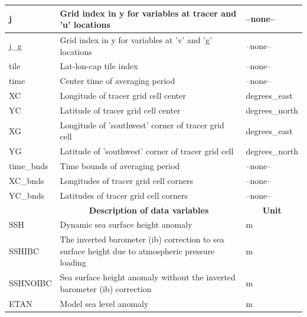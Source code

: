 \begin{longtable}{|m{}|m{}|m{}|}
j &Grid index in y for variables at tracer and 'u' locations &--none--  \\ \hline
j\_g &Grid index in y for variables at 'v' and 'g' locations &--none--  \\ \hline
tile &Lat-lon-cap tile index &--none--  \\ \hline
time &Center time of averaging period &--none--  \\ \hline
XC &Longitude of tracer grid cell center &degrees\_east  \\ \hline
YC &Latitude of tracer grid cell center &degrees\_north  \\ \hline
XG &Longitude of 'southwest' corner of tracer grid cell &degrees\_east  \\ \hline
YG &Latitude of 'southwest' corner of tracer grid cell &degrees\_north  \\ \hline
time\_bnds &Time bounds of averaging period &--none--  \\ \hline
XC\_bnds &Longitudes of tracer grid cell corners &--none--  \\ \hline
YC\_bnds &Latitudes of tracer grid cell corners &--none--  \\ \hline
\rowcolor{lightgray} \multicolumn{1}{|c|}{\textbf{Variables}} & \multicolumn{1}{|c|}{\textbf{Description of data variables}} &  \multicolumn{1}{|c|}{\textbf{Unit}}\\ \hline
SSH &Dynamic sea surface height anomaly &m  \\ \hline
SSHIBC &The inverted barometer (ib) correction to sea surface height due to atmospheric pressure loading &m  \\ \hline
SSHNOIBC &Sea surface height anomaly without the inverted barometer (ib) correction &m  \\ \hline
ETAN &Model sea level anomaly &m  \\ \hline
\end{longtable}

\newp
\pagebreak
